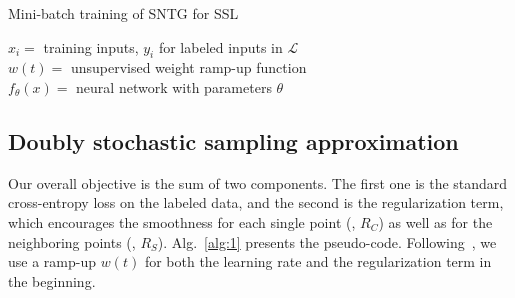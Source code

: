 \documentclass[10pt,twocolumn,letterpaper]{article}
\begin{document}
\begin{algorithm}[t]
	\caption{Mini-batch training of SNTG for SSL}
	\label{alg:1}
	\begin{algorithmic}[1]
		\REQUIRE $x_i=$ training inputs, $y_i$ for labeled inputs in $\mathcal{L}$\\
		\REQUIRE $w(t) = $ unsupervised weight ramp-up function\\
		\REQUIRE $f_\theta(x) = $ neural network with parameters $\theta$
		\ENDFOR
		\ENDFOR	
		\ENDFOR
	\end{algorithmic}
\end{algorithm}
\label{sec:alg}
\subsection{Doubly stochastic sampling approximation}
Our overall objective is the sum of two components. The first one is the standard cross-entropy loss on the labeled data, and the second is the regularization term, which encourages the smoothness for each single point (\ie, $R_C$) as well as for the neighboring points (\ie, $R_S$). Alg.~\ref{alg:1} presents the pseudo-code. Following~\cite{laine2016temporal}, we use a ramp-up $w(t)$ for both the learning rate and the regularization term in the beginning.
\end{document}
